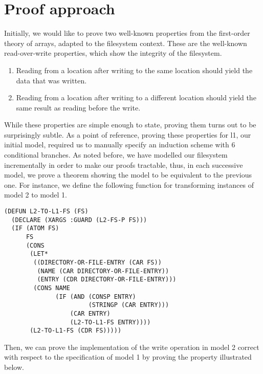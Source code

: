 \documentclass[format=sigconf,review=true]{acmart}
\begin{document}
\section {Proof approach}

Initially, we would like to prove two well-known properties from the
first-order theory of arrays, adapted to the filesystem context. These
are the well-known read-over-write properties, which show the
integrity of the filesystem.

\begin {enumerate}
\item Reading from a location after writing to the same location
  should yield the data that was written.
\item Reading from a location after writing to a different
  location should yield the same result as reading before the write.
\end {enumerate}

While these properties are simple enough to state, proving them turns
out to be surprisingly subtle. As a point of reference, proving these
properties for l1, our initial model, required us to manually specify
an induction scheme with 6 conditional branches. As noted
before, we have modelled our filesystem incrementally in order to make
our proofs tractable, thus, in each successive model, we prove a
theorem showing the model to be equivalent to the previous one. For
instance, we define the following function for transforming
instances of model 2 to model 1.

\begin{lstlisting}
(DEFUN L2-TO-L1-FS (FS)
  (DECLARE (XARGS :GUARD (L2-FS-P FS)))
  (IF (ATOM FS)
      FS
      (CONS
       (LET*
        ((DIRECTORY-OR-FILE-ENTRY (CAR FS))
         (NAME (CAR DIRECTORY-OR-FILE-ENTRY))
         (ENTRY (CDR DIRECTORY-OR-FILE-ENTRY)))
        (CONS NAME
              (IF (AND (CONSP ENTRY)
                       (STRINGP (CAR ENTRY)))
                  (CAR ENTRY)
                  (L2-TO-L1-FS ENTRY))))
       (L2-TO-L1-FS (CDR FS)))))
\end{lstlisting}

Then, we can prove the implementation of the write operation in model
2 correct with respect to the specification of model 1 by proving the
property illustrated below.

\end{document}
